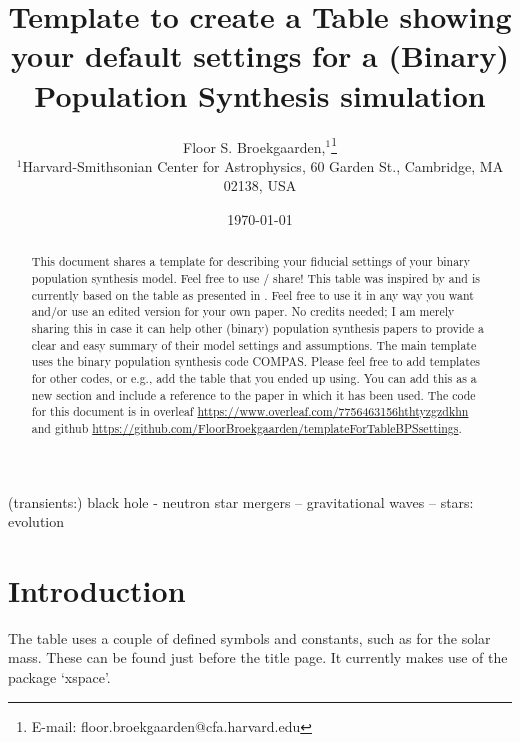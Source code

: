 \documentclass[fleqn,usenatbib, onecolumn]{mnras}
\title[BPS settings table template]{Template to create a Table showing your default settings for a (Binary) Population Synthesis simulation}
\author[]{Floor S. Broekgaarden,$^{1}$\thanks{E-mail: floor.broekgaarden@cfa.harvard.edu}
\\
$^{1}${Harvard-Smithsonian Center for Astrophysics,
60 Garden St., Cambridge, MA 02138, USA}
}
\date{\today}
\begin{document}
\label{firstpage}
\pagerange{\pageref{firstpage}--\pageref{lastpage}}
\maketitle

\begin{abstract}
This document shares a template for describing your fiducial settings of your binary population synthesis model. Feel free to use / share! This table was inspired by \citet{2018MNRAS.481.1908K} and is currently based on the table as presented in \citet{2021arXiv210302608B}. Feel free to use it in any way you want and/or use an edited version for your own paper. No credits needed; I am merely sharing this in case it can help other (binary) population synthesis papers to provide a clear and easy summary of their model settings and assumptions. The main template uses the binary population synthesis code COMPAS. Please  feel free to add  templates for other codes, or e.g., add the table that you ended up using. You can add this as a new section and include a reference to the paper in which it has been used. 
The code for this document is in overleaf \href{https://www.overleaf.com/7756463156hthtyzgzdkhn}{https://www.overleaf.com/7756463156hthtyzgzdkhn} and github  \href{https://github.com/FloorBroekgaarden/templateForTableBPSsettings}{https://github.com/FloorBroekgaarden/templateForTableBPSsettings}. 
\end{abstract}

\begin{keywords}
(transients:) black hole - neutron star mergers -- gravitational waves -- stars: evolution
\end{keywords}





\section{Introduction}
The table uses a couple of defined symbols and constants, such as for the solar mass. These can be found just before the title page. It currently makes use of the package `xspace'. 
\end{document}
